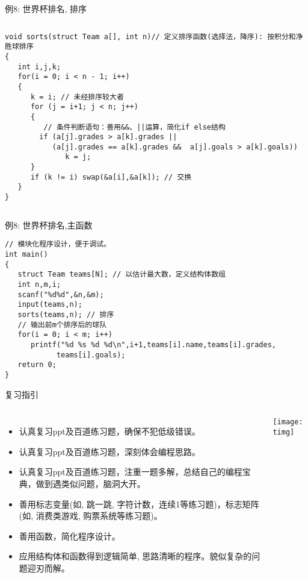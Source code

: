 \begin{frame}{例8: 世界杯排名, 排序}
\vspace{-0.5cm}
\begin{columns}[T]
\begin{lstlisting}
void sorts(struct Team a[], int n)// 定义排序函数(选择法，降序): 按积分和净胜球排序 
{
   int i,j,k;
   for(i = 0; i < n - 1; i++)
   {
      k = i; // 未经排序较大者
      for (j = i+1; j < n; j++)
      {
         // 条件判断语句：善用&&、||运算，简化if else结构 
        if (a[j].grades > a[k].grades || 
           (a[j].grades == a[k].grades &&  a[j].goals > a[k].goals))  
              k = j;
      }
      if (k != i) swap(&a[i],&a[k]); // 交换
   } 
}
\end{lstlisting}
\end{columns}
\medskip
\end{frame}

\begin{frame}{例8: 世界杯排名,主函数}
\vspace{-0.4cm}
\begin{lstlisting}
// 模块化程序设计，便于调试。
int main()
{
   struct Team teams[N]; // 以估计最大数，定义结构体数组 
   int n,m,i;
   scanf("%d%d",&n,&m);
   input(teams,n); 
   sorts(teams,n); // 排序
   // 输出前m个排序后的球队 
   for(i = 0; i < m; i++)
      printf("%d %s %d %d\n",i+1,teams[i].name,teams[i].grades,
      		teams[i].goals);
   return 0;
}
\end{lstlisting}
\end{frame}

\begin{frame}{复习指引}
\vspace{-0.2cm}
\begin{columns}
	\begin{itemize}
		\item 认真复习ppt及百道练习题，确保不犯低级错误。
		\item 认真复习ppt及百道练习题，深刻体会编程思路。
		\item 认真复习ppt及百道练习题，注重一题多解，总结自己的编程宝典，做到遇类似问题，脑洞大开。
		\item 善用标志变量(如, 跳一跳, 字符计数，连续1等练习题)，标志矩阵(如, 消费类游戏, 购票系统等练习题)。
		\item 善用函数，简化程序设计。
		\item 应用结构体和函数得到逻辑简单, 思路清晰的程序。貌似复杂的问题迎刃而解。 
	\end{itemize}
	\centering\texttt{[image: timg]}
\end{columns}
\end{frame}

